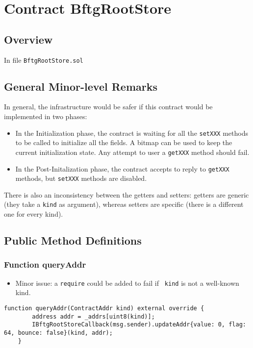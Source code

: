 
\chapter{Contract BftgRootStore}

\minitoc

\section{Overview}


In file {\tt BftgRootStore.sol}

\section{General Minor-level Remarks}

In general, the infrastructure would be safer if this contract would
be implemented in two phases:
\begin{itemize}
\item In the Initialization phase, the contract is waiting for all the
  {\tt setXXX} methods to be called to initialize all the fields. A
  bitmap can be used to keep the current initialization state. Any
  attempt to user a {\tt getXXX} method should fail.
\item In the Post-Initalization phase, the contract accepts to reply
  to {\tt getXXX} methods, but {\tt setXXX} methods are disabled.
\end{itemize}

There is also an inconsistency between the getters and setters:
getters are generic (they take a {\tt kind} as argument), whereas
setters are specific (there is a different one for every kind).

\section{Public Method Definitions}


\subsection{Function queryAddr}

\begin{itemize}
\item Minor issue: a {\tt require} could be added to fail if {\tt
  kind} is not a well-known kind.
\end{itemize}

\begin{lstlisting}[firstnumber=26]
    function queryAddr(ContractAddr kind) external override {
        address addr = _addrs[uint8(kind)];
        IBftgRootStoreCallback(msg.sender).updateAddr{value: 0, flag: 64, bounce: false}(kind, addr);
    }
\end{lstlisting}

